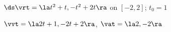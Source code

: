 {$\ds \vrt = \la t^2+t,-t^2+2t \ra$ on $[-2,2]$; $t_0=1$
}
{
$\vvt = \la 2t+1,-2t+2\ra$, $\vat = \la 2,-2\ra$

}